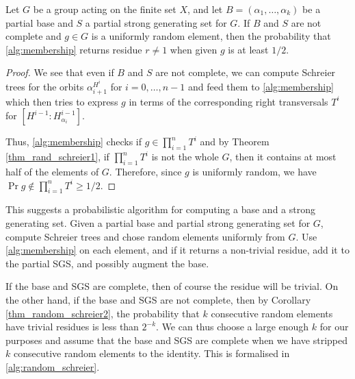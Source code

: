\begin{cl} \label{thm_random_schreier2}
  Let $G$ be a group acting on the finite set $X$, and let $B =
  (\alpha_1, \dotsc, \alpha_k)$ be a partial base and $S$ a partial
  strong generating set for $G$. If $B$ and $S$ are not complete and $g \in G$ is a uniformly random element, then the probability that \ref{alg:membership} returns residue $r \neq 1$ when given $g$ is at least $1/2$.
\end{cl}
\begin{proof}
  We see that even if $B$ and $S$ are not complete, we can compute
  Schreier trees for the orbits $\alpha_{i + 1}^{H^i}$ for $i = 0,
  \dotsc, n - 1$ and feed them to \ref{alg:membership} which then
  tries to express $g$ in terms of the corresponding right
  transversals $T^i$ for $[H^{i - 1} : H^{i - 1}_{\alpha_i}]$.
  
  Thus, \ref{alg:membership} checks if $g \in \prod_{i = 1}^n T^i$ and
  by Theorem \ref{thm_rand_schreier1}, if $\prod_{i = 1}^n T^i$ is not
  the whole $G$, then it contains at most half of the elements of $G$.
  Therefore, since $g$ is uniformly random, we have $\Pr{g \notin
    \prod_{i = 1}^n T^i} \geq 1/2$.
\end{proof}

This suggests a probabilistic algorithm for computing a base and a
strong generating set. Given a partial base and partial strong
generating set for $G$, compute Schreier trees and chose random
elements uniformly from $G$. Use \ref{alg:membership} on each element,
and if it returns a non-trivial residue, add it to the partial SGS,
and possibly augment the base.

If the base and SGS are complete, then of course the residue will be trivial. On the other hand, if the base and SGS are not complete, then by
Corollary \ref{thm_random_schreier2}, the probability that $k$
consecutive random elements have trivial residues is less than
$2^{-k}$. We can thus choose a large enough $k$ for our purposes and
assume that the base and SGS are complete when we have stripped $k$
consecutive random elements to the identity. This is formalised in
\ref{alg:random_schreier}.

